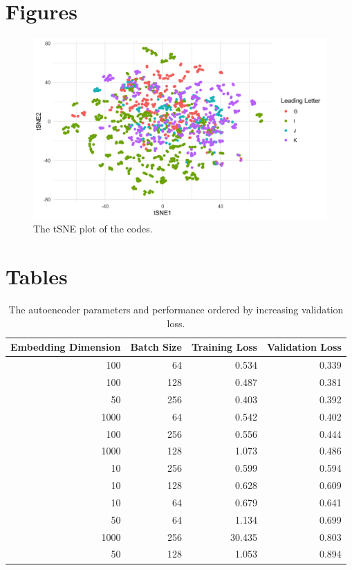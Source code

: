 \documentclass{bmcart}
\begin{document}
\begin{backmatter}

\pagebreak

\section*{Figures}

\begin{figure}[ht!]
  \includegraphics[width=\linewidth]{tsne-plot.png}
  \caption{The tSNE plot of the codes.}
  \label{fig:tsne}
\end{figure}


\pagebreak
\section*{Tables}

\begin{table}[ht!]
\caption{The autoencoder parameters and performance ordered by increasing validation loss.}
\label{tab:autoencoder_perf}
\begin{tabular}{|r|r|r|r|}
\hline
Embedding Dimension & Batch Size & Training Loss & Validation Loss\\
\hline
100 & 64 & 0.534 & 0.339\\
\hline
100 & 128 & 0.487 & 0.381\\
\hline
50 & 256 & 0.403 & 0.392\\
\hline
1000 & 64 & 0.542 & 0.402\\
\hline
100 & 256 & 0.556 & 0.444\\
\hline
1000 & 128 & 1.073 & 0.486\\
\hline
10 & 256 & 0.599 & 0.594\\
\hline
10 & 128 & 0.628 & 0.609\\
\hline
10 & 64 & 0.679 & 0.641\\
\hline
50 & 64 & 1.134 & 0.699\\
\hline
1000 & 256 & 30.435 & 0.803\\
\hline
50 & 128 & 1.053 & 0.894\\
\hline
\end{tabular}
\end{table}


\end{backmatter}
\end{document}
